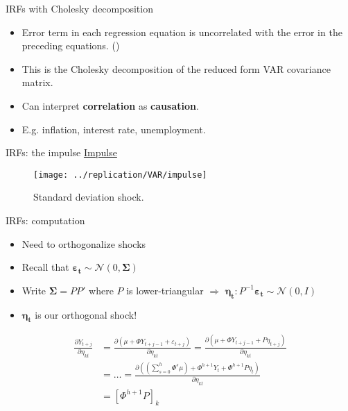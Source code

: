 \documentclass{beamer}
\begin{document}
	\begin{frame}[label=chol]{IRFs with Cholesky decomposition}
	\begin{itemize}
		\item Error term in each regression equation is
		uncorrelated with the error in the preceding equations. \hfill (\hyperlink{system}{})
		
		\item This is the Cholesky decomposition of the reduced form VAR covariance matrix.
		
		\item Can interpret \textbf{correlation} as \textbf{causation}.
		
		\item E.g. inflation, interest rate, unemployment.
	\end{itemize}
	\end{frame}
		
	
	\begin{frame}{IRFs: the impulse}
		\underline{Impulse}
		\begin{figure}
		\centering
		\texttt{[image: ../replication/VAR/impulse]}
		\caption{Standard deviation shock.}
		\label{fig:impulse}
		\end{figure}
	\end{frame}
	
	\begin{frame}{IRFs: computation}
		\begin{itemize}
			\item Need to orthogonalize shocks
			\item Recall that $\bm{\varepsilon_{t}} \sim \mathcal{N}(0,\bm{\Sigma})$
			\item Write $\bm{\Sigma} = PP'$ where $P$ is lower-triangular $\Rightarrow$ $\bm{\eta_{t}}: P^{-1}\bm{\varepsilon_{t}} \sim \mathcal{N}(0,I)$
			\item $\bm{\eta_{t}}$ is our orthogonal shock!
		\end{itemize}
		\begin{align*}
		\frac{\partial Y_{t+j}}{\partial \eta_{kt}} &= \frac{\partial (\mu + \Phi Y_{t+j-1} + \varepsilon_{t+j})}{\partial \eta_{kt}} =  \frac{\partial (\mu + \Phi Y_{t+j-1} + P\eta_{t+j})}{\partial \eta_{kt}}\\
		& = \dots = \frac{\partial \left(\left(\sum_{s=0}^{h} \Phi^{s} \mu\right) + \Phi^{h+1} Y_{t} + \Phi^{h+1}P\eta_{t}\right)}{\partial \eta_{kt}}\\
		&=\left[\Phi^{h+1}P\right]_{k}
		\end{align*}
	\end{frame}	
	
\end{document}
